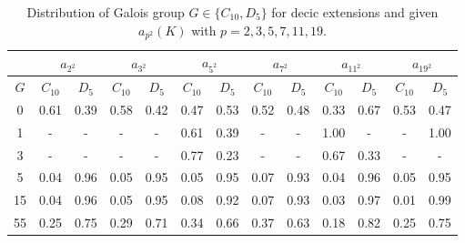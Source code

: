 \documentclass[letterpaper, 10pt]{article}
\newcommand{\1}{\mathds{1}}	%
\theoremstyle{definition}
\theoremstyle{remark}
\begin{document}
\begin{table}[H]
    \begin{center}
        \begin{tabular}{c|c|c|c|c|c|c|c|c|c|c|c|c}
            \toprule
             & \multicolumn{2}{c|}{$a_{2^2}$} & \multicolumn{2}{c|}{$a_{3^2}$} & \multicolumn{2}{c|}{$a_{5^2}$} & \multicolumn{2}{c|}{$a_{7^2}$} & \multicolumn{2}{c|}{$a_{11^2}$} & \multicolumn{2}{c}{$a_{19^2}$} \\
            \midrule
            $G$ & $C_{10}$ & $D_5$ & $C_{10}$ & $D_5$ & $C_{10}$ & $D_5$ & $C_{10}$ & $D_5$ & $C_{10}$ & $D_5$ & $C_{10}$ & $D_5$ \\
            \midrule
            0 & 0.61 & 0.39 & 0.58 & 0.42 & 0.47 & 0.53 & 0.52 & 0.48 & 0.33 & 0.67 & 0.53 & 0.47 \\
            1 & - & - & - & - & 0.61 & 0.39 & - & - & 1.00 & - & - & 1.00 \\
            3 & - & - & - & - & 0.77 & 0.23 & - & - & 0.67 & 0.33 & - & - \\
            5 & 0.04 & 0.96 & 0.05 & 0.95 & 0.05 & 0.95 & 0.07 & 0.93 & 0.04 & 0.96 & 0.05 & 0.95 \\
            15 & 0.04 & 0.96 & 0.05 & 0.95 & 0.08 & 0.92 & 0.07 & 0.93 & 0.03 & 0.97 & 0.01 & 0.99 \\
            55 & 0.25 & 0.75 & 0.29 & 0.71 & 0.34 & 0.66 & 0.37 & 0.63 & 0.18 & 0.82 & 0.25 & 0.75 \\
            \bottomrule
        \end{tabular}
        \caption{Distribution of Galois group $G \in \{C_{10}, D_5\}$ for  decic extensions and given $a_{ p^2}(K)$ with $p = 2, 3, 5, 7, 11, 19$.}
        \label{tab:decic_psq_dist_G}
    \end{center}
\end{table}
\end{document}
